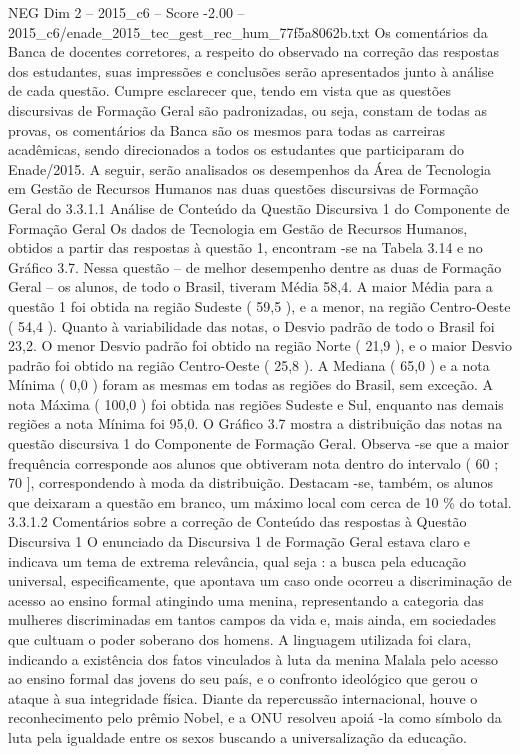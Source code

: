 \begin{textsample}{NEG Dim 2 – 2015\_c6 – Score -2.00 – 2015\_c6/enade\_2015\_tec\_gest\_rec\_hum\_77f5a8062b.txt}
Os comentários da Banca de docentes corretores, a respeito do observado na correção das respostas dos estudantes, suas impressões e conclusões serão apresentados junto à análise de cada questão.
Cumpre esclarecer que, tendo em vista que as questões discursivas de Formação Geral são padronizadas, ou seja, constam de todas as provas, os comentários da Banca são os mesmos para todas as carreiras acadêmicas, sendo direcionados a todos os estudantes que participaram do Enade/2015.
A seguir, serão analisados os desempenhos da Área de Tecnologia em Gestão de Recursos Humanos nas duas questões discursivas de Formação Geral do 3.3.1.1 Análise de Conteúdo da Questão Discursiva 1 do Componente de Formação Geral Os dados de Tecnologia em Gestão de Recursos Humanos, obtidos a partir das respostas à questão 1, encontram -se na Tabela 3.14 e no Gráfico 3.7.
Nessa questão – de melhor desempenho dentre as duas de Formação Geral – os alunos, de todo o Brasil, tiveram Média 58,4.
A maior Média para a questão 1 foi obtida na região Sudeste ( 59,5 ), e a menor, na região Centro-Oeste ( 54,4 ).
Quanto à variabilidade das notas, o Desvio padrão de todo o Brasil foi 23,2.
O menor Desvio padrão foi obtido na região Norte ( 21,9 ), e o maior Desvio padrão foi obtido na região Centro-Oeste ( 25,8 ).
A Mediana ( 65,0 ) e a nota Mínima ( 0,0 ) foram as mesmas em todas as regiões do Brasil, sem exceção.
A nota Máxima ( 100,0 ) foi obtida nas regiões Sudeste e Sul, enquanto nas demais regiões a nota Mínima foi 95,0.
O Gráfico 3.7 mostra a distribuição das notas na questão discursiva 1 do Componente de Formação Geral.
Observa -se que a maior frequência corresponde aos alunos que obtiveram nota dentro do intervalo ( 60 ; 70 ], correspondendo à moda da distribuição.
Destacam -se, também, os alunos que deixaram a questão em branco, um máximo local com cerca de 10 \% do total. 3.3.1.2 Comentários sobre a correção de Conteúdo das respostas à Questão Discursiva 1 O enunciado da Discursiva 1 de Formação Geral estava claro e indicava um tema de extrema relevância, qual seja : a busca pela educação universal, especificamente, que apontava um caso onde ocorreu a discriminação de acesso ao ensino formal atingindo uma menina, representando a categoria das mulheres discriminadas em tantos campos da vida e, mais ainda, em sociedades que cultuam o poder soberano dos homens.
A linguagem utilizada foi clara, indicando a existência dos fatos vinculados à luta da menina Malala pelo acesso ao ensino formal das jovens do seu país, e o confronto ideológico que gerou o ataque à sua integridade física.
Diante da repercussão internacional, houve o reconhecimento pelo prêmio Nobel, e a ONU resolveu apoiá -la como símbolo da luta pela igualdade entre os sexos buscando a universalização da educação.

\end{textsample}
